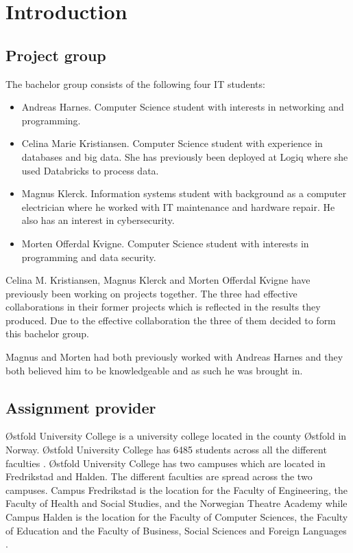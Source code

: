 \chapter{Introduction}
\section{Project group}
The bachelor group consists of the following four IT students:
\begin{itemize}
    \item Andreas Harnes. 
    Computer Science student with interests in networking and programming.
    \item Celina Marie Kristiansen.
    Computer Science student with experience in databases and big data.
    She has previously been deployed at Logiq where she used Databricks to process data.
    \item Magnus Klerck.
    Information systems student with background as a computer electrician where he worked with IT maintenance and hardware repair.
    He also has an interest in cybersecurity.
    \item Morten Offerdal Kvigne.
    Computer Science student with interests in programming and data security.
\end{itemize}
Celina M. Kristiansen, Magnus Klerck and Morten Offerdal Kvigne have previously been working on projects together.
The three had effective collaborations in their former projects which is reflected in the results they produced.
Due to the effective collaboration the three of them decided to form this bachelor group.

Magnus and Morten had both previously worked with Andreas Harnes and they both believed him to be knowledgeable and as such he was brought in.

\section{Assignment provider}
Østfold University College is a university college located in the county Østfold in Norway. Østfold University College has 6485 students across all the different faculties \cite{total_stundets_at_Hiof}. Østfold University College has two campuses which are located in Fredrikstad and Halden. The different faculties are spread across the two campuses. Campus Fredrikstad is the location for the Faculty of Engineering, the Faculty of Health and Social Studies, and the Norwegian Theatre Academy while Campus Halden is the location for the Faculty of Computer Sciences, the Faculty of Education and the Faculty of Business, Social Sciences and Foreign Languages \cite{Hiof_fakta}. 

